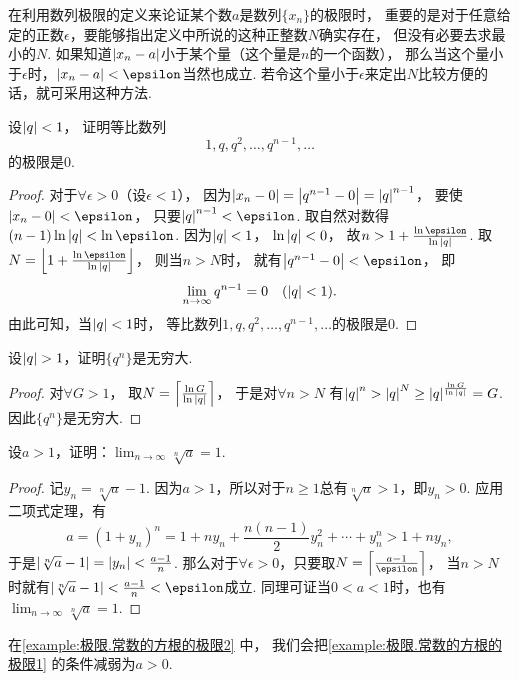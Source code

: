 在利用数列极限的定义来论证某个数\(a\)是数列\(\{x_n\}\)的极限时，
重要的是对于任意给定的正数\(\epsilon\)，要能够指出定义中所说的这种正整数\(N\)确实存在，
但没有必要去求最小的\(N\).
如果知道\(\abs{x_n-a}\)小于某个量（这个量是\(n\)的一个函数），
那么当这个量小于\(\epsilon\)时，\(\abs{x_n-a}<\epsilon\)当然也成立.
若令这个量小于\(\epsilon\)来定出\(N\)比较方便的话，就可采用这种方法.

\begin{example}
设\(\abs{q}<1\)，
证明等比数列\[
	1,q,q^2,\dotsc,q^{n-1},\dotsc
\]的极限是\(0\).
\begin{proof}
对于\(\forall\epsilon>0\)（设\(\epsilon<1\)），
因为\(\abs{x_n-0}=\abs{q^{n-1}-0}=\abs{q}^{n-1}\)，
要使\(\abs{x_n-0}<\epsilon\)，
只要\(\abs{q}^{n-1}<\epsilon\).
取自然对数得\((n-1)\ln\abs{q}<\ln\epsilon\).
因为\(\abs{q}<1\)，
\(\ln\abs{q}<0\)，
故\(n>1+\frac{\ln\epsilon}{\ln\abs{q}}\).
取\(N=\floor*{1+\frac{\ln\epsilon}{\ln\abs{q}}}\)，
则当\(n>N\)时，
就有\(\abs{q^{n-1}-0}<\epsilon\)，
即
\begin{equation}\label{equation:数列极限.重要极限1}
	\lim_{n\to\infty}q^{n-1}=0
	\quad(\abs{q}<1).
\end{equation}
由此可知，当\(\abs{q}<1\)时，
等比数列\(1,q,q^2,\dotsc,q^{n-1},\dotsc\)的极限是\(0\).
\end{proof}
\end{example}

\begin{example}
设\(\abs{q}>1\)，证明\(\{q^n\}\)是无穷大.
\begin{proof}
对\(\forall G>1\)，
取\(N=\ceil*{\frac{\ln G}{\ln\abs{q}}}\)，
于是对\(\forall n>N\)
有\(\abs{q}^n > \abs{q}^N \geq \abs{q}^{\frac{\ln G}{\ln\abs{q}}} = G\).
因此\(\{q^n\}\)是无穷大.
\end{proof}
\end{example}

\begin{example}\label{example:极限.常数的方根的极限1}
设\(a>1\)，证明：\(\lim_{n\to\infty} \sqrt[n]{a} = 1\).
\begin{proof}
记\(y_n=\sqrt[n]{a}-1\).
因为\(a>1\)，所以对于\(n\geq1\)总有\(\sqrt[n]{a}>1\)，即\(y_n>0\).
应用二项式定理，有\[
	a = (1+y_n)^n
	= 1 + n y_n + \frac{n(n-1)}2 y_n^2 + \dotsb + y_n^n
	> 1 + n y_n,
\]
于是\(\abs{\sqrt[n]{a}-1} = \abs{y_n} < \frac{a-1}{n}\).
那么对于\(\forall\epsilon>0\)，只要取\(N=\ceil*{\frac{a-1}{\epsilon}}\)，
当\(n>N\)时就有\(\abs{\sqrt[n]{a}-1} < \frac{a-1}{n} < \epsilon\)成立.
同理可证当\(0<a<1\)时，也有\(\lim_{n\to\infty} \sqrt[n]{a} = 1\).
\end{proof}
\end{example}
\begin{remark}
在\cref{example:极限.常数的方根的极限2} 中，
我们会把\cref{example:极限.常数的方根的极限1} 的条件减弱为\(a>0\).
\end{remark}

